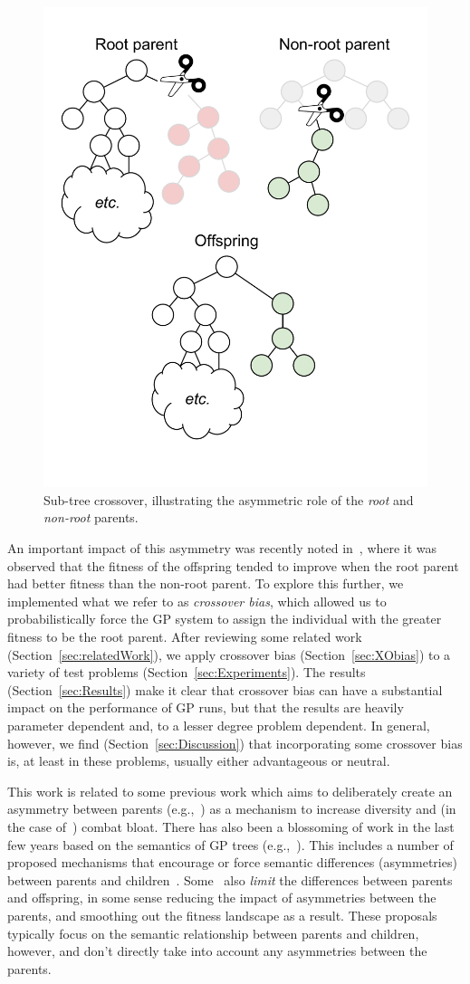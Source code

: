 \documentclass{sig-alternate}
\begin{document}
\begin{figure}
	\centering
	\includegraphics[width=0.35 \textwidth]{Plots/Root_parent_illustration_no_triangle.pdf}
	\caption{Sub-tree crossover, illustrating the asymmetric role of the \emph{root} and \emph{non-root} parents.}
	\label{fig:root_parent_illustration}
\end{figure}

An important impact of this asymmetry was recently noted in~\cite{McPheeDonatucciDramdahl:2014}, where it was observed
that the fitness of the offspring tended to improve when the root parent had better fitness than the non-root parent.
To explore this further, we implemented what we refer to as \emph{crossover bias}, which allowed us to
probabilistically force the GP system to assign the individual with the greater fitness to be the root parent. 
After reviewing some related work (Section~\ref{sec:relatedWork}),
we apply crossover bias (Section~\ref{sec:XObias}) to a variety of test problems
(Section~\ref{sec:Experiments}). The results (Section~\ref{sec:Results}) make it clear that crossover bias can have a
substantial impact on the performance of GP runs, but that the results are heavily parameter dependent and, to a lesser
degree problem dependent. In general, however, we find (Section~\ref{sec:Discussion}) that incorporating some crossover
bias is, at least in these problems, usually either advantageous or neutral.

This work is related to some previous work which aims to deliberately create an asymmetry 
between parents (e.g.,~\cite{ryan1994pygmies,gohsexualselection}) as a mechanism to increase 
diversity and (in the case of~\cite{ryan1994pygmies}) combat bloat. There has also been a 
blossoming of work in the last few years based on the semantics of GP trees (e.g.,~\cite{McPhee:2008:SBB:1792694.1792707,moraglio2012geometric}). This includes a 
number of proposed mechanisms that encourage or force semantic differences (asymmetries) 
between parents and children~\cite{uy2011semantically,beadle2008semantically}. Some~\cite{uy2013roles} 
also \emph{limit} the differences between parents and offspring, in some sense reducing the impact 
of asymmetries between the parents, and smoothing out the fitness landscape as a result. These 
proposals typically focus on the semantic relationship between parents and children, however, and 
don't directly take into account any asymmetries between the parents.
\end{document}
